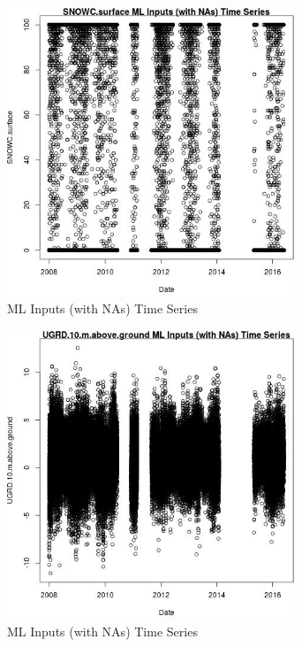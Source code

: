 \begin{figure} 
\centering  
\includegraphics[width=0.77\textwidth]{Code_Outputs/Report_ML_input_PM25_Step4_part_e_de_duplicated_aveswNAs_SNOWCsurfacevDate.jpg} 
\caption{\label{fig:Report_ML_input_PM25_Step4_part_e_de_duplicated_aveswNAsSNOWCsurfacevDate}ML Inputs (with NAs) Time Series} 
\end{figure} 
 

\begin{figure} 
\centering  
\includegraphics[width=0.77\textwidth]{Code_Outputs/Report_ML_input_PM25_Step4_part_e_de_duplicated_aveswNAs_UGRD10mabovegroundvDate.jpg} 
\caption{\label{fig:Report_ML_input_PM25_Step4_part_e_de_duplicated_aveswNAsUGRD10mabovegroundvDate}ML Inputs (with NAs) Time Series} 
\end{figure} 
 

